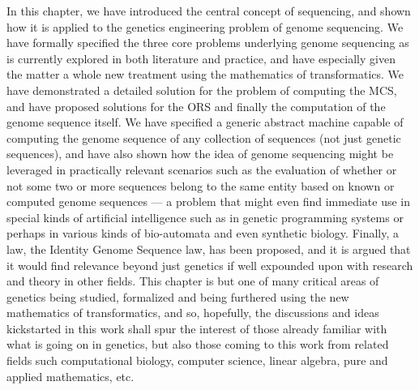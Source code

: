 \documentclass[a4paper, 18pt]{article} %
\begin{document}
In this chapter, we have introduced the central concept of sequencing, and shown how it is applied to the genetics engineering problem of genome sequencing. We have formally specified the three core problems underlying genome sequencing as is currently explored in both literature and practice, and have especially given the matter a whole new treatment using the mathematics of transformatics. We have demonstrated a detailed solution for the problem of computing the MCS, and have proposed solutions for the ORS and finally the computation of the genome sequence itself. We have specified a generic abstract machine capable of computing the genome sequence of any collection of sequences (not just genetic sequences), and have also shown how the idea of genome sequencing might be leveraged in practically relevant scenarios such as the evaluation of whether or not some two or more sequences belong to the same entity based on known or computed genome sequences --- a problem that might even find immediate use in special kinds of artificial intelligence such as in genetic programming systems or perhaps in various kinds of bio-automata and even synthetic biology. Finally, a law, the Identity Genome Sequence law, has been proposed, and it is argued that it would find relevance beyond just genetics if well expounded upon with research and theory in other fields. This chapter is but one of many critical areas of genetics being studied, formalized and being furthered using the new mathematics of transformatics, and so, hopefully, the discussions and ideas kickstarted in this work shall spur the interest of those already familiar with what is going on in genetics, but also those coming to this work from related fields such computational biology, computer science, linear algebra, pure and applied mathematics, etc.




\end{document}
